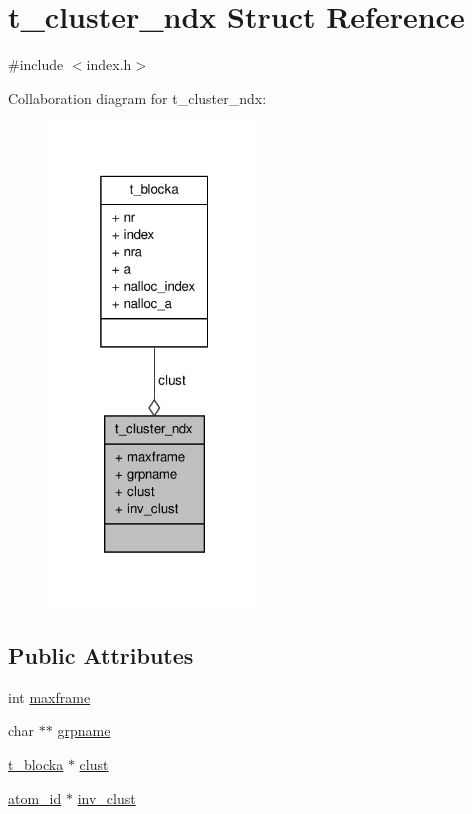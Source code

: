 \hypertarget{structt__cluster__ndx}{\section{t\-\_\-cluster\-\_\-ndx \-Struct \-Reference}
\label{structt__cluster__ndx}
}


{\ttfamily \#include $<$index.\-h$>$}



\-Collaboration diagram for t\-\_\-cluster\-\_\-ndx\-:
\nopagebreak
\begin{figure}[H]
\begin{center}
\leavevmode
\includegraphics[width=160pt]{structt__cluster__ndx__coll__graph}
\end{center}
\end{figure}
\subsection*{\-Public \-Attributes}
\begin{DoxyCompactItemize}
\item 
int \hyperlink{structt__cluster__ndx_a7a40234513dfbd54fd6666c8a6fa9278}{maxframe}
\item 
char $\ast$$\ast$ \hyperlink{structt__cluster__ndx_ada6eb70e13ea87c0a836bc3a89949fc3}{grpname}
\item 
\hyperlink{structt__blocka}{t\-\_\-blocka} $\ast$ \hyperlink{structt__cluster__ndx_a44e66e1ebe8101eca9f418ffee09ccf0}{clust}
\item 
\hyperlink{include_2types_2simple_8h_ad3f47cdb48677e516e2049719612c737}{atom\-\_\-id} $\ast$ \hyperlink{structt__cluster__ndx_a7edcd7772ffba5859ca0db4f2216342a}{inv\-\_\-clust}
\end{DoxyCompactItemize}


